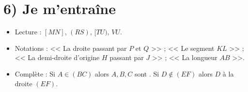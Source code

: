 \section*{6) Je m'entraîne}
\begin{itemize}
	\item Lecture : $[MN]$, $(RS)$, $[TU)$, $VU$.
	\item Notations : << La droite passant par $P$ et $Q$ >> ; << Le segment $KL$ >> ; << La demi-droite d'origine $H$ passant par $J$ >> ; << La longueur $AB$ >>.
	\item Complète : Si $A \in (BC)$ alors $A,B,C$ sont \trou{2cm}. Si $D \notin (EF)$ alors $D$ \trou{2cm} à la droite $(EF)$.
\end{itemize}

